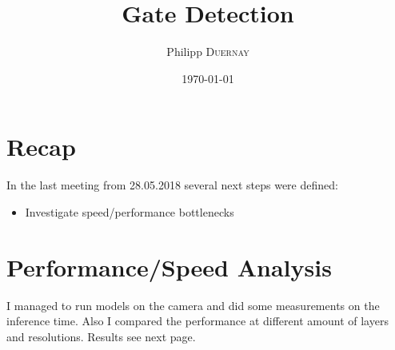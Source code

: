 \documentclass{article}
\title{Gate Detection} %
\author{Philipp \textsc{Duernay}} %
\date{\today} %
\begin{document}
\maketitle


\section{Recap}
In the last meeting from 28.05.2018 several next steps were defined:
\begin{itemize}
	\item Investigate speed/performance bottlenecks
\end{itemize}


\section{Performance/Speed Analysis}

I managed to run models on the camera and did some measurements on the inference time. Also I compared the performance at different amount of layers and resolutions. Results see next page.
\end{document}
